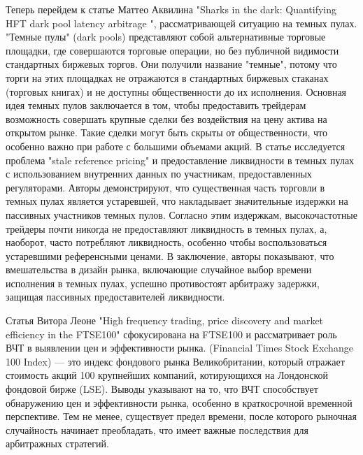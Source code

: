\documentclass{letask}
\begin{document}
Теперь перейдем к статье Маттео Аквилина "Sharks in the dark: Quantifying HFT dark pool latency arbitrage
", рассматривающей ситуацию на темных пулах. "Темные пулы" (dark pools) представляют собой альтернативные торговые площадки, где совершаются торговые операции, но без публичной видимости стандартных биржевых торгов. Они получили название "темные", потому что торги на этих площадках не отражаются в стандартных биржевых стаканах (торговых книгах) и не доступны общественности до их исполнения. Основная идея темных пулов заключается в том, чтобы предоставить трейдерам возможность совершать крупные сделки без воздействия на цену актива на открытом рынке. Такие сделки могут быть скрыты от общественности, что особенно важно при работе с большими объемами акций. В статье исследуется проблема "stale reference pricing" и предоставление ликвидности в темных пулах с использованием внутренних данных по участникам, предоставленных регуляторами. Авторы демонстрируют, что существенная часть торговли в темных пулах является устаревшей, что накладывает значительные издержки на пассивных участников темных пулов. Согласно этим издержкам, высокочастотные трейдеры почти никогда не предоставляют ликвидность в темных пулах, а, наоборот, часто потребляют ликвидность, особенно чтобы воспользоваться устаревшими референсными ценами. В заключение, авторы показывают, что вмешательства в дизайн рынка, включающие случайное выбор времени исполнения в темных пулах, успешно противостоят арбитражу задержки, защищая пассивных предоставителей ликвидности.

Статья Витора Леоне "High frequency trading, price discovery and market efficiency in the FTSE100" сфокусирована на FTSE100 и рассматривает роль ВЧТ в выявлении цен и эффективности рынка. (Financial Times Stock Exchange 100 Index) — это индекс фондового рынка Великобритании, который отражает стоимость акций 100 крупнейших компаний, котирующихся на Лондонской фондовой бирже (LSE). Выводы указывают на то, что ВЧТ способствует обнаружению цен и эффективности рынка, особенно в краткосрочной временной перспективе. Тем не менее, существует предел времени, после которого рыночная случайность начинает преобладать, что имеет важные последствия для арбитражных стратегий.
\end{document}

